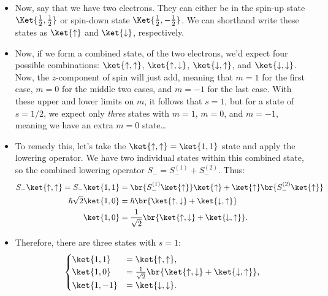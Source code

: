 \begin{itemize}
    \item Now, say that we have two electrons. They can either be in the spin-up state $\Ket{\frac{1}{2},\frac{1}{2}}$ or spin-down state $\Ket{\frac{1}{2},-\frac{1}{2}}$. We can shorthand write these states as $\ket{\uparrow}$ and $\ket{\downarrow}$, respectively.
    \item Now, if we form a combined state, of the two electrons, we'd expect four possible combinations: $\ket{\uparrow,\uparrow}$, $\ket{\uparrow,\downarrow}$, $\ket{\downarrow,\uparrow}$, and $\ket{\downarrow,\downarrow}$. Now, the $z$-component of spin will just add, meaning that $m=1$ for the first case, $m=0$ for the middle two cases, and $m=-1$ for the last case. With these upper and lower limits on $m$, it follows that $s=1$, but for a state of $s=1/2$, we expect only \textit{three} states with $m=1$, $m=0$, and $m=-1$, meaning we have an extra $m=0$ state\ldots
    \item To remedy this, let's take the $\ket{\uparrow,\uparrow} = \ket{1,1}$ state and apply the lowering operator. We have two individual states within this combined state, so the combined lowering operator $S_- = S_-^{(1)} + S_-^{(2)}$. Thus:
        \begin{align}
            S_- \ket{\uparrow,\uparrow} = S_-\ket{1,1} &= \br{S_-^{(1)}\ket{\uparrow}}\ket{\uparrow} + \ket{\uparrow}\br{S_-^{(2)}\ket{\uparrow}} \\
            \hbar\sqrt{2}\ket{1,0} &= \hbar\br{\ket{\uparrow,\downarrow} + \ket{\downarrow,\uparrow}} \\
            \ket{1,0} &= \frac{1}{\sqrt{2}}\br{\ket{\uparrow,\downarrow} + \ket{\downarrow,\uparrow}}.
        \end{align}
    \item Therefore, there are three states with $s=1$:
        \begin{equation}
            \begin{alignedat}{1}
            \begin{cases}
                \ket{1,1}  &= \ket{\uparrow,\uparrow}, \\
                \ket{1,0}  &= \frac{1}{\sqrt{2}}\br{\ket{\uparrow,\downarrow} + \ket{\downarrow,\uparrow}}, \\
                \ket{1,-1} &= \ket{\downarrow,\downarrow}.
            \end{cases}
            \end{alignedat}
        \end{equation}

\end{itemize}
